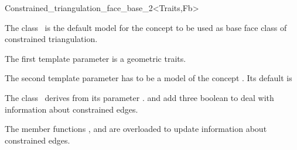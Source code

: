 

\begin{ccRefClass}{Constrained_triangulation_face_base_2<Traits,Fb>}  %


\ccDefinition
 The class \ccRefName\ is the default model for the concept
 to be used as base face class
of constrained triangulation.


\ccIsModel
{}

\ccParameters
The first template parameter is a geometric traits.

The second template parameter has to be a model
of the concept .
Its default is 

\ccInheritsFrom
The class \ccRefName\  derives from its parameter .
and add three boolean to deal with information about
constrained edges.

The member functions , 
and  are overloaded  to update
information about constrained edges.

\ccSeeAlso
{} \\
\\
 \\


\end{ccRefClass}


